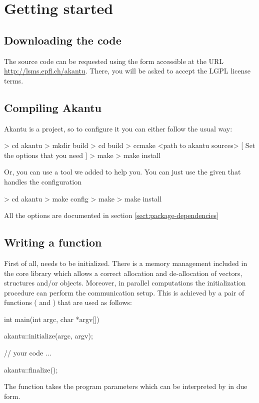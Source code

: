 \chapter{Getting started}
\section{Downloading the code}

The \akantu source code can be requested using the form accessible at the URL
\url{http://lsms.epfl.ch/akantu}.  There, you will be asked to accept the LGPL
license terms.

\section{Compiling Akantu}

Akantu is a  project, so to configure it you can either follow the usual way:
\begin{command}
  > cd akantu
  > mkdir build
  > cd build
  > ccmake <path to akantu sources>
  [ Set the options that you need ]
  > make
  > make install
\end{command}

\noindent Or, you can use a tool  we added to help you. You can just use the
given  that handles the  configuration

\begin{command}
  > cd akantu
  > make config
  > make
  > make install
\end{command}

\noindent All the \akantu options are documented in section \ref{sect:package-dependencies}


\section{Writing a  function\label{sect:common:main}}

First of all, \akantu needs to be initialized.  There is a memory
management included in the core library which allows a correct
allocation and de-allocation of vectors, structures and/or
objects. Moreover, in parallel computations the initialization
procedure can perform the communication setup. This is achieved by
 a pair of functions ( and )
that are used as follows:
\begin{cpp}
int main(int argc, char *argv[])
{
  akantu::initialize(argc, argv);

  // your code
  ...

  akantu::finalize();
}
\end{cpp}
The  function takes the program parameters which
can be interpreted by \akantu in due form.

